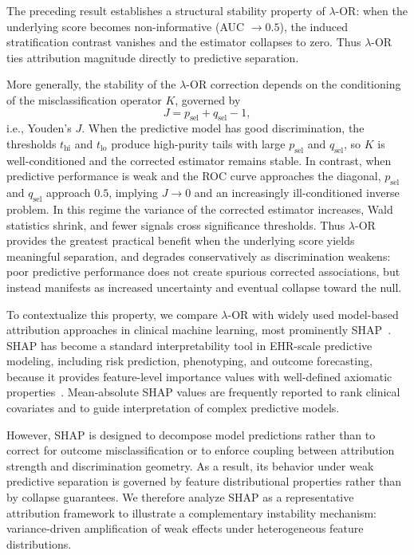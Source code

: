 \documentclass[pdflatex,sn-mathphys-num]{sn-jnl}%
\theoremstyle{thmstyleone}%
\theoremstyle{thmstyletwo}%
\theoremstyle{thmstylethree}%
\begin{document}
The preceding result establishes a structural stability property of $\lambda$-OR: 
when the underlying score becomes non-informative (AUC $\to 0.5$), 
the induced stratification contrast vanishes and the estimator collapses to zero. 
Thus $\lambda$-OR ties attribution magnitude directly to predictive separation.

More generally, the stability of the $\lambda$-OR correction depends on the conditioning of the misclassification operator $K$, governed by
\[
J = p_{\mathrm{sel}} + q_{\mathrm{sel}} - 1,
\]
i.e., Youden's $J$. When the predictive model has good discrimination, the thresholds $t_{\mathrm{hi}}$ and $t_{\mathrm{lo}}$ produce high-purity tails with large $p_{\mathrm{sel}}$ and $q_{\mathrm{sel}}$, so $K$ is well-conditioned and the corrected estimator remains stable. In contrast, when predictive performance is weak and the ROC curve approaches the diagonal, $p_{\mathrm{sel}}$ and $q_{\mathrm{sel}}$ approach $0.5$, implying $J \to 0$ and an increasingly ill-conditioned inverse problem. In this regime the variance of the corrected estimator increases, Wald statistics shrink, and fewer signals cross significance thresholds. Thus $\lambda$-OR provides the greatest practical benefit when the underlying score yields meaningful separation, and degrades conservatively as discrimination weakens: poor predictive performance does not create spurious corrected associations, but instead manifests as increased uncertainty and eventual collapse toward the null.

To contextualize this property, we compare $\lambda$-OR with widely used 
model-based attribution approaches in clinical machine learning, 
most prominently SHAP~\cite{lundberg17shap}. 
SHAP has become a standard interpretability tool in EHR-scale predictive modeling, 
including risk prediction, phenotyping, and outcome forecasting, 
because it provides feature-level importance values with well-defined axiomatic properties~\cite{lundberg17shap,choi2016retain}. 
Mean-absolute SHAP values are frequently reported to rank clinical covariates 
and to guide interpretation of complex predictive models.

However, SHAP is designed to decompose model predictions rather than 
to correct for outcome misclassification or to enforce coupling between 
attribution strength and discrimination geometry. 
As a result, its behavior under weak predictive separation is governed 
by feature distributional properties rather than by collapse guarantees. 
We therefore analyze SHAP as a representative attribution framework 
to illustrate a complementary instability mechanism: 
variance-driven amplification of weak effects under heterogeneous feature distributions.
\end{document}
